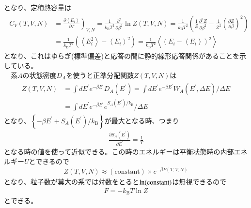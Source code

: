 \documentclass[a4paper,12pt, oneside, openany]{jsbook}
\begin{document}
となり、定積熱容量は
\begin{eqnarray}
  \begin{split}
    C_V(T,V,N) &=\left.\frac{\partial \left\langle E_i\right\rangle}{\partial T}\right)_{V,N}= \frac{1}{k_{\text{B}}T^2} \frac{\partial^2}{\partial \beta^2}\ln Z(T,V,N)=\frac{1}{k_{\text{B}}T^2} \left(\frac{1}{Z}\frac{\partial^2 Z}{\partial \beta^2}-\frac{1}{Z^2}\left( \frac{\partial Z}{\partial \beta}\right)^2\right) \\
    &=\frac{1}{k_{\text{B}}T^2} \left(\left\langle E_i^2\right\rangle -\left\langle E_i \right\rangle^2\right)=\frac{1}{k_{\text{B}}T^2} \left\langle \left(E_i-\left\langle E_i\right\rangle \right)^2\right\rangle
  \end{split}
\end{eqnarray}
となり、これはゆらぎ(標準偏差)と応答の間に静的線形応答関係があることを示している。\\
　系$A$の状態密度$D_A$を使うと正準分配関数$Z(T,V,N)$は
\begin{eqnarray}
  \label{seijun}
  \begin{split}
    Z(T,V,N)&=\int dE^{'} e^{-\beta E^{'}}D_A(E^{'})=\int dE^{'} e^{-\beta E^{'}}W_A(E^{'},\Delta E)/{\Delta E}\\
    &=\int dE^{'} e^{-\beta E^{'}}e^{S_A(E^{'})/k_{\text{B}}}/{\Delta E} 
  \end{split}
\end{eqnarray}
となり、$\left\{-\beta E^{'} + S_A(E^{'})/k_{\text{B}}\right\}$が最大となる時、つまり
\begin{eqnarray}
  \frac{\partial S_A(E^{'})}{\partial E^{'}}=\frac{1}{T}
\end{eqnarray}
となる時の値を使って近似できる。この時のエネルギーは平衡状態時の内部エネルギー$U$とできるので
\begin{eqnarray}
  Z(T,V,N)\approx (\text{constant}) \times e^{-\beta F(T,V,N)}
\end{eqnarray}
となり、粒子数が莫大の系では対数をとると$\ln (\rm{constant})$は無視できるので
\begin{eqnarray}
  \label{canonical bridge}
  F = -k_{\text{B}}T \ln Z
\end{eqnarray}
とできる。
\end{document}
